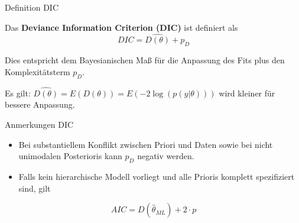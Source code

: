 \documentclass[ignorenonframetext,]{beamer}
\providecommand{\tightlist}{%
\setlength{\itemsep}{0pt}\setlength{\parskip}{0pt}}
\begin{document}
\begin{frame}{Definition DIC}

Das \textbf{Deviance Information Criterion (DIC)} ist definiert als \[
DIC=\hat{D(\theta)}+p_D
\]

Dies entspricht dem Bayesianischen Maß für die Anpassung des Fits plus
den Komplexitätsterm \(p_D\).

Es gilt: \(\hat{D(\theta)}=E(D(\theta))=E(-2\log(p(y|\theta)))\) wird
kleiner für bessere Anpassung.

\end{frame}

\begin{frame}{Anmerkungen DIC}

\begin{itemize}
\tightlist
\item
  Bei substantiellem Konflikt zwischen Priori und Daten sowie bei nicht
  unimodalen Posterioris kann \(p_D\) negativ werden.
\item
  Falls kein hierarchische Modell vorliegt und alle Prioris komplett
  spezifiziert sind, gilt
\end{itemize}

\[ AIC=D(\hat{\theta}_{ML})+2\cdot p \]

\end{frame}
\end{document}
